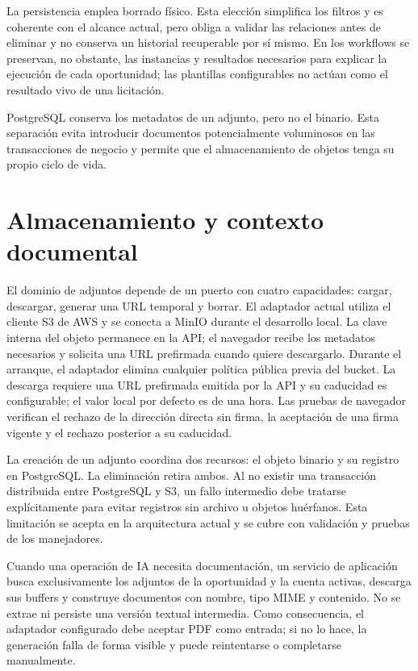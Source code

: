 La persistencia emplea borrado físico. Esta elección simplifica los filtros y
es coherente con el alcance actual, pero obliga a validar las relaciones antes
de eliminar y no conserva un historial recuperable por sí mismo. En los
workflows se preservan, no obstante, las instancias y resultados necesarios
para explicar la ejecución de cada oportunidad; las plantillas configurables
no actúan como el resultado vivo de una licitación.

PostgreSQL conserva los metadatos de un adjunto, pero no el binario. Esta
separación evita introducir documentos potencialmente voluminosos en las
transacciones de negocio y permite que el almacenamiento de objetos tenga su
propio ciclo de vida.

\section{Almacenamiento y contexto documental}
\label{sec:attachment-architecture}

El dominio de adjuntos depende de un puerto con cuatro capacidades: cargar,
descargar, generar una URL temporal y borrar. El adaptador actual utiliza el
cliente S3 de AWS y se conecta a MinIO durante el desarrollo local. La clave
interna del objeto permanece en la API; el navegador recibe los metadatos
necesarios y solicita una URL prefirmada cuando quiere descargarlo. Durante el
arranque, el adaptador elimina cualquier política pública previa del bucket. La
descarga requiere una URL prefirmada emitida por la API y su caducidad es
configurable; el valor local por defecto es de una hora. Las pruebas de
navegador verifican el rechazo de la dirección directa sin firma, la aceptación
de una firma vigente y el rechazo posterior a su caducidad.

La creación de un adjunto coordina dos recursos: el objeto binario y su
registro en PostgreSQL. La eliminación retira ambos. Al no existir una
transacción distribuida entre PostgreSQL y S3, un fallo intermedio debe
tratarse explícitamente para evitar registros sin archivo u objetos huérfanos.
Esta limitación se acepta en la arquitectura actual y se cubre con validación y
pruebas de los manejadores.

Cuando una operación de IA necesita documentación, un servicio de aplicación
busca exclusivamente los adjuntos de la oportunidad y la cuenta activas,
descarga sus buffers y construye documentos con nombre, tipo MIME y contenido.
No se extrae ni persiste una versión textual intermedia. Como consecuencia, el
adaptador configurado debe aceptar PDF como entrada; si no lo hace, la
generación falla de forma visible y puede reintentarse o completarse
manualmente.

